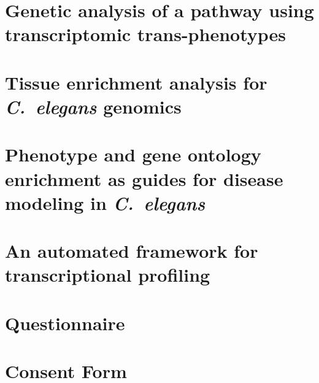 \documentclass[12pt]{caltech_thesis}
\newcommand{\cel}{\emph{C.~elegans}}
\begin{document}
\chapter{Genetic analysis of a pathway using transcriptomic trans-phenotypes}
\begin{refsection}
\end{refsection}

\chapter{Tissue enrichment analysis for \cel{} genomics}
\begin{refsection}
\end{refsection}

\chapter{Phenotype and gene ontology enrichment as guides for disease modeling
         in \cel{}}
\begin{refsection}
\end{refsection}

\chapter{An automated framework for transcriptional profiling}
\begin{refsection}
\end{refsection}



\printbibliography[heading=bibintoc]

\appendix

\chapter{Questionnaire}
\chapter{Consent Form}

\printindex

\theendnotes{}

{}
\end{document}

